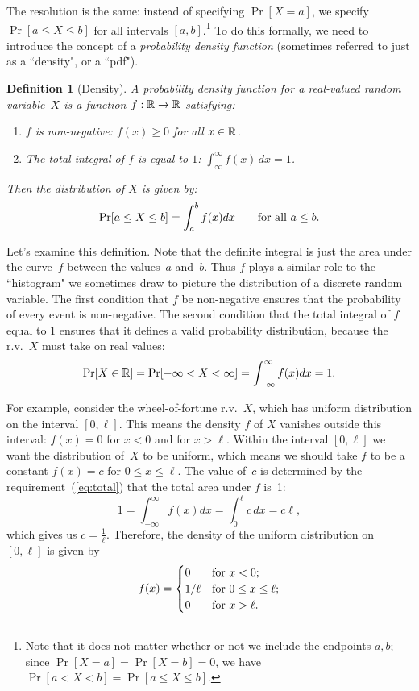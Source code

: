 \documentclass[11pt]{article}
\newcounter{thm}
\newtheorem{definition}{Definition}[thm]
\begin{document}
The resolution is the same: instead of specifying $\Pr[X=a]$, we
specify $\Pr[a\le X\le b]$ for  all intervals $[a,b]$.\footnote{Note that it does not matter
whether or not we include the endpoints $a,b$; since $\Pr[X=a]=\Pr[X=b]=0$, we
have $\Pr[a< X< b] = \Pr[a\le X\le b]$.}  To do this formally, we need to introduce
the concept of a {\it probability density function\/} (sometimes  referred to just as
a ``density", or a ``pdf").
\begin{definition}[Density]
A {\em probability density function} for a real-valued random variable~$X$ is a function
$f:\mathbb{R}\to\mathbb{R}$ satisfying:
\begin{enumerate}
  \item $f$ is non-negative: $f(x) \ge 0$ for all $x \in \mathbb{R}$.
  \item The total integral of $f$ is equal to $1$: $\int_\infty^\infty f(x) \, dx = 1$.
\end{enumerate}
Then the distribution of $X$ is given by:
 $$\Pr[a\le X\le b] = \int_{a}^b f(x) dx\qquad\hbox{\rm for all $a\le b$}.  $$
\end{definition}

Let's examine this definition.   Note that  the definite integral is  just the area
under the curve~$f$ between the values~$a$ and~$b$.  Thus $f$ plays a similar
role to the ``histogram" we sometimes draw to picture the distribution of a
discrete random variable.  The first condition that $f$ be non-negative ensures
that the probability of every event is non-negative. The second condition that the
total integral of $f$ equal to $1$ ensures that it defines a valid probability distribution,
because the r.v.~$X$ must take on real values:
\begin{equation}\label{eq:total}
 \Pr[X \in \mathbb{R}] = \Pr[-\infty < X < \infty] = \int_{-\infty}^\infty f(x) dx =  1.
\end{equation}



For example, consider the wheel-of-fortune r.v.~$X$, which has uniform distribution
on the interval $[0,\ell]$. This means the density $f$ of $X$ vanishes outside this interval:
$f(x)=0$ for $x<0$ and for $x>\ell$.  Within the interval $[0,\ell]$ we want
the distribution of~$X$ to be uniform, which means we should take $f$ to be a constant $f(x)=c$
for $0\le x\le\ell$. The value of~$c$ is determined by
the requirement~(\ref{eq:total}) that the total area under $f$ is~1:
$$1 = \int_{-\infty}^\infty f(x) dx = \int_{0}^\ell c \, dx = c\ell,$$
which gives us $c=\frac{1}{\ell}$. Therefore, the density of the uniform
distribution on $[0,\ell]$ is given by $$
   f(x) = \begin{cases}
       0 & \hbox{\rm for $x<0$;}\cr
       1/\ell & \hbox{\rm for $0\le x\le\ell$;}\cr
       0 & \hbox{\rm for $x>\ell$.}\cr
   \end{cases}  $$
\end{document}
